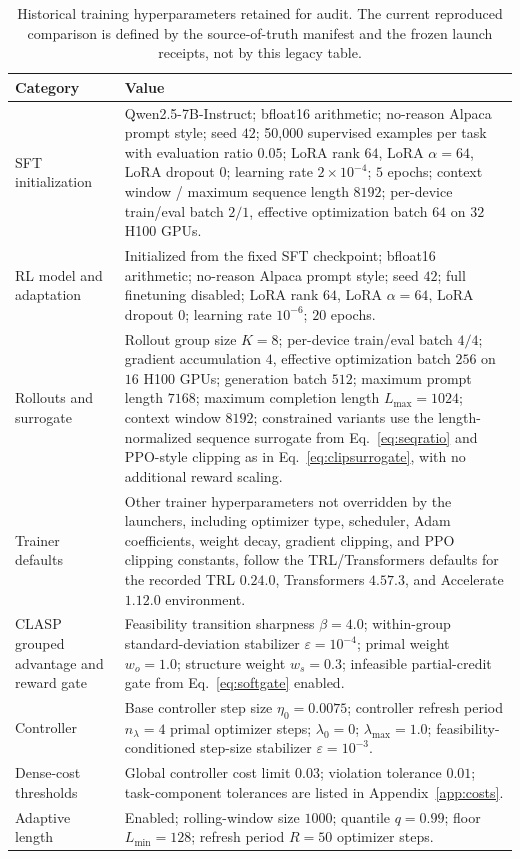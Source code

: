 \documentclass{article}
\theoremstyle{remark}
\begin{document}
\begin{table}[t]
\caption{Historical training hyperparameters retained for audit. The current reproduced comparison is defined by the source-of-truth manifest and the frozen launch receipts, not by this legacy table.}
\label{tab:rl_hparams}
\centering
\small
\begin{tabularx}{\textwidth}{lX}
\toprule
Category & Value \\
\midrule
SFT initialization & Qwen2.5-7B-Instruct; bfloat16 arithmetic; no-reason Alpaca prompt style; seed \(42\); 50{,}000 supervised examples per task with evaluation ratio \(0.05\); LoRA rank \(64\), LoRA \(\alpha=64\), LoRA dropout \(0\); learning rate \(2\times 10^{-4}\); \(5\) epochs; context window / maximum sequence length \(8192\); per-device train/eval batch \(2/1\), effective optimization batch \(64\) on \(32\) H100 GPUs. \\
RL model and adaptation & Initialized from the fixed SFT checkpoint; bfloat16 arithmetic; no-reason Alpaca prompt style; seed \(42\); full finetuning disabled; LoRA rank \(64\), LoRA \(\alpha=64\), LoRA dropout \(0\); learning rate \(10^{-6}\); \(20\) epochs. \\
Rollouts and surrogate & Rollout group size \(K=8\); per-device train/eval batch \(4/4\); gradient accumulation \(4\), effective optimization batch \(256\) on \(16\) H100 GPUs; generation batch \(512\); maximum prompt length \(7168\); maximum completion length \(L_{\max}=1024\); context window \(8192\); constrained variants use the length-normalized sequence surrogate from Eq.~\eqref{eq:seqratio} and PPO-style clipping as in Eq.~\eqref{eq:clipsurrogate}, with no additional reward scaling. \\
Trainer defaults & Other trainer hyperparameters not overridden by the launchers, including optimizer type, scheduler, Adam coefficients, weight decay, gradient clipping, and PPO clipping constants, follow the TRL/Transformers defaults for the recorded TRL \(0.24.0\), Transformers \(4.57.3\), and Accelerate \(1.12.0\) environment. \\
CLASP grouped advantage and reward gate & Feasibility transition sharpness \(\beta=4.0\); within-group standard-deviation stabilizer \(\varepsilon=10^{-4}\); primal weight \(w_o=1.0\); structure weight \(w_s=0.3\); infeasible partial-credit gate from Eq.~\eqref{eq:softgate} enabled. \\
Controller & Base controller step size \(\eta_0=0.0075\); controller refresh period \(n_\lambda=4\) primal optimizer steps; \(\lambda_0=0\); \(\lambda_{\max}=1.0\); feasibility-conditioned step-size stabilizer \(\varepsilon=10^{-3}\). \\
Dense-cost thresholds & Global controller cost limit \(0.03\); violation tolerance \(0.01\); task-component tolerances are listed in Appendix~\ref{app:costs}. \\
Adaptive length & Enabled; rolling-window size \(1000\); quantile \(q=0.99\); floor \(L_{\min}=128\); refresh period \(R=50\) optimizer steps. \\
\bottomrule
\end{tabularx}
\end{table}
\end{document}
